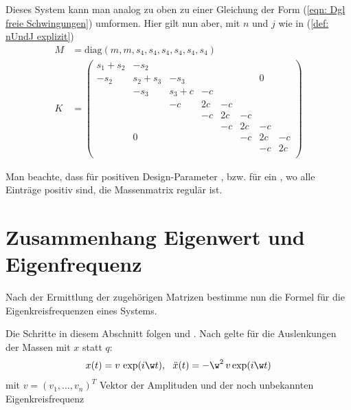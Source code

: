 \documentclass[a4paper,12pt]{report}
\newcommand{\zitat}[1]{\glqq #1\grqq}
\newcommand{\diag}{\text{diag}}
\newcommand{\1}{\mathds{1}}
\theoremstyle{plain} %
\theoremstyle{definition} %
\theoremstyle{remark}
\begin{document}
            Dieses System kann man analog zu oben zu einer Gleichung der Form (\ref{eqn: Dgl freie Schwingungen}) umformen.
            Hier gilt nun aber, mit $n$ und $j$ wie in (\ref{def: nUndJ explizit})
            \begin{align}
                  M &= \diag(m, m, s_4, s_4, s_4, s_4, s_4, s_4)\label{def: M2}\\
                  K &= \begin{pmatrix}
                        s_1+s_2 & -s_2 &  &  &  &  &  &  \\
                        -s_2 &  s_2+s_3& -s_3 &  &  &  &0  &  \\
                              & -s_3 & s_3+c & -c &  &  &  &  \\
                              &  & -c & 2c & -c &  &  &  \\
                              &  &  & -c & 2c & -c &  &  \\
                              &  &  &  & -c & 2c & -c &  \\
                              & 0 & &  &  & -c & 2c &  -c\\
                              &  &  &  &  &  & -c & 2c \\
                        \end{pmatrix}\label{def: K2}
            \end{align}
                  
            Man beachte, dass für positiven Design-Parameter \s, bzw. für ein \s, wo alle Einträge positiv sind, die Massenmatrix regulär ist.

      \section{Zusammenhang Eigenwert und Eigenfrequenz}
            \label{sec: Formel EW}      
            Nach der Ermittlung der zugehörigen Matrizen bestimme nun die Formel für die Eigenkreisfrequenzen eines Systems.

            Die Schritte in diesem Abschnitt folgen \cite[S. 380]{maschinendynamikDresig} und \cite[S. 2]{hauptteilTkachuk}.
            Nach \cite[S. 380]{maschinendynamikDresig} gelte für die Auslenkungen der Massen mit $x$ statt $q$:
            $$x(t) = v\,\exp(i\w t),\ \ \ddot x(t) = -\w^2\,v \exp(i\w t)$$
            mit $v=(v_1,\dots,v_n)^T$ Vektor der Amplituden und der \zitat{noch unbekannten Eigenkreisfrequenz \w}\cite[S. 380]{maschinendynamikDresig}
            
\end{document}
